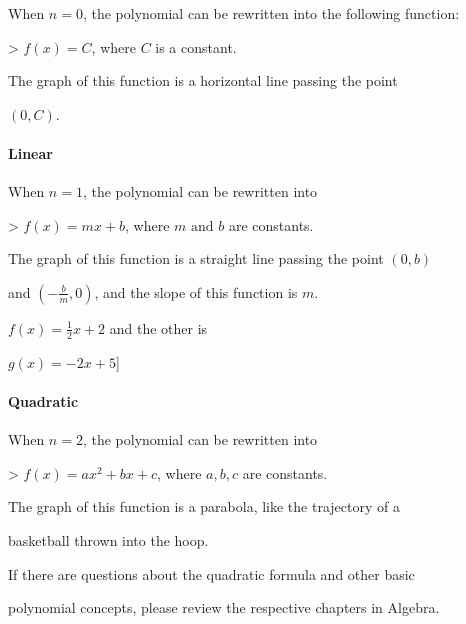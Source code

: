 When $n=0$, the polynomial can be rewritten into the following function:



> $f(x)=C$, where $C$ is a constant.



The graph of this function is a horizontal line passing the point

$(0,C)$.



\paragraph{Linear}



When $n=1$, the polynomial can be rewritten into



> $f(x)=mx+b$, where $m\text{ and }b$ are constants.



The graph of this function is a straight line passing the point $(0,b)$

and $(-\frac{b}{m},0)$, and the slope of this function is $m$. 




$f(x)=\frac{1}{2}x+2$ and the other is

$g(x)=-2x+5$]



\paragraph{Quadratic}



When $n=2$, the polynomial can be rewritten into



> $f(x)=ax^2+bx+c$, where $a,b,c$ are constants.



The graph of this function is a parabola, like the trajectory of a

basketball thrown into the hoop.



If there are questions about the quadratic formula and other basic

polynomial concepts, please review the respective chapters in Algebra.




